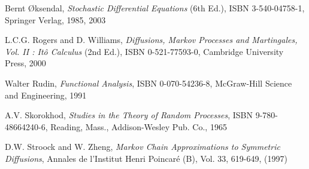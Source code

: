 \begin{thebibliography}{[88]}
     Bernt \O ksendal,
     \emph{Stochastic Differential Equations} (6th Ed.),
     ISBN 3-540-04758-1,
     Springer Verlag, 1985, 2003

     L.C.G. Rogers and D. Williams,
     \emph{Diffusions, Markov Processes and Martingales, Vol. II : It\^o Calculus} (2nd Ed.),
     ISBN 0-521-77593-0,
     Cambridge University Press, 2000

     Walter Rudin, 
     \emph{Functional Analysis}, 
     ISBN 0-070-54236-8,  
     McGraw-Hill Science and Engineering, 1991

     A.V. Skorokhod,
     \emph{Studies in the Theory of Random Processes},
     ISBN 9-780-48664240-6, 
     Reading, Mass., Addison-Wesley Pub. Co., 1965  

     D.W. Stroock and W. Zheng,
     \emph{Markov Chain Approximations to Symmetric Diffusions},
     Annales de l'Institut Henri Poincar\'e (B), Vol. 33, 619-649, (1997)  

\end{thebibliography}
